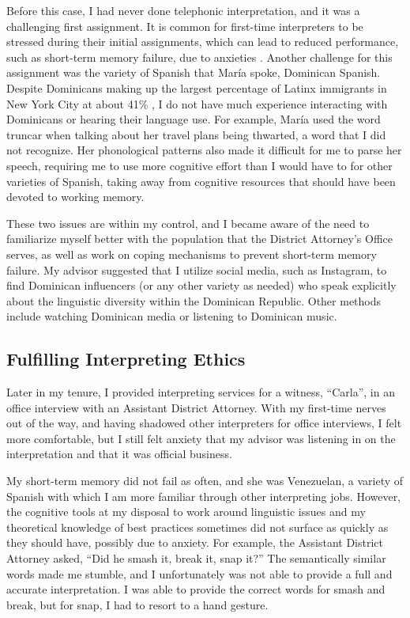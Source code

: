 \documentclass{article}
\begin{document}
Before this case, I had never done telephonic interpretation, and it was a challenging first assignment. It is common for first-time interpreters to be stressed during their initial assignments, which can lead to reduced performance, such as short-term memory failure, due to anxieties \citep{yang_tan2017}. 
Another challenge for this assignment was the variety of Spanish that María spoke, Dominican Spanish. Despite Dominicans making up the largest percentage of Latinx immigrants in New York City at about 41\% \citep{nyc_immigrant_fact_sheet}, I do not have much experience interacting with Dominicans or hearing their language use. For example, María used the word truncar when talking about her travel plans being thwarted, a word that I did not recognize. Her phonological patterns also made it difficult for me to parse her speech, requiring me to use more cognitive effort than I would have to for other varieties of Spanish, taking away from cognitive resources that should have been devoted to working memory.

These two issues are within my control, and I became aware of the need to familiarize myself better with the population that the District Attorney’s Office serves, as well as work on coping mechanisms to prevent short-term memory failure. My advisor suggested that I utilize social media, such as Instagram, to find Dominican influencers (or any other variety as needed) who speak explicitly about the linguistic diversity within the Dominican Republic. Other methods include watching Dominican media or listening to Dominican music.

\subsection{Fulfilling Interpreting Ethics}

Later in my tenure, I provided interpreting services for a witness, “Carla”, in an office interview with an Assistant District Attorney. With my first-time nerves out of the way, and having shadowed other interpreters for office interviews, I felt more comfortable, but I still felt anxiety that my advisor was listening in on the interpretation and that it was official business. 

My short-term memory did not fail as often, and she was Venezuelan, a variety of Spanish with which I am more familiar through other interpreting jobs. However, the cognitive tools at my disposal to work around linguistic issues and my theoretical knowledge of best practices sometimes did not surface as quickly as they should have, possibly due to anxiety. For example, the Assistant District Attorney asked, “Did he smash it, break it, snap it?” The semantically similar words made me stumble, and I unfortunately was not able to provide a full and accurate interpretation. I was able to provide the correct words for smash and break, but for snap, I had to resort to a hand gesture.
\end{document}
